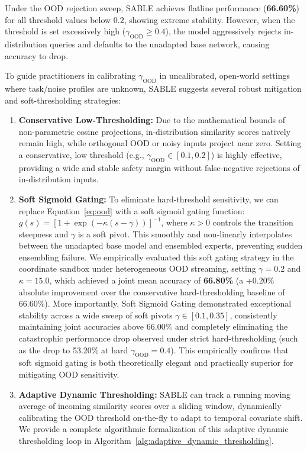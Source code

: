 \begin{itemize}
    Under the OOD rejection sweep, SABLE achieves flatline performance (\textbf{66.60\%}) for all threshold values below $0.2$, showing extreme stability. However, when the threshold is set excessively high ($\gamma_{\text{OOD}} \ge 0.4$), the model aggressively rejects in-distribution queries and defaults to the unadapted base network, causing accuracy to drop. 

    To guide practitioners in calibrating $\gamma_{\text{OOD}}$ in uncalibrated, open-world settings where task/noise profiles are unknown, SABLE suggests several robust mitigation and soft-thresholding strategies:
    \begin{enumerate}
        \item \textbf{Conservative Low-Thresholding:} Due to the mathematical bounds of non-parametric cosine projections, in-distribution similarity scores natively remain high, while orthogonal OOD or noisy inputs project near zero. Setting a conservative, low threshold (e.g., $\gamma_{\text{OOD}} \in [0.1, 0.2]$) is highly effective, providing a wide and stable safety margin without false-negative rejections of in-distribution inputs.
        \item \textbf{Soft Sigmoid Gating:} To eliminate hard-threshold sensitivity, we can replace Equation~\ref{eq:ood} with a soft sigmoid gating function: $g(s) = [1 + \exp(-\kappa (s - \gamma))]^{-1}$, where $\kappa > 0$ controls the transition steepness and $\gamma$ is a soft pivot. This smoothly and non-linearly interpolates between the unadapted base model and ensembled experts, preventing sudden ensembling failure. We empirically evaluated this soft gating strategy in the coordinate sandbox under heterogeneous OOD streaming, setting $\gamma = 0.2$ and $\kappa = 15.0$, which achieved a joint mean accuracy of \textbf{66.80\%} (a +0.20\% absolute improvement over the conservative hard-thresholding baseline of 66.60\%). More importantly, Soft Sigmoid Gating demonstrated exceptional stability across a wide sweep of soft pivots $\gamma \in [0.1, 0.35]$, consistently maintaining joint accuracies above 66.00\% and completely eliminating the catastrophic performance drop observed under strict hard-thresholding (such as the drop to 53.20\% at hard $\gamma_{\text{OOD}} = 0.4$). This empirically confirms that soft sigmoid gating is both theoretically elegant and practically superior for mitigating OOD sensitivity.
        \item \textbf{Adaptive Dynamic Thresholding:} SABLE can track a running moving average of incoming similarity scores over a sliding window, dynamically calibrating the OOD threshold on-the-fly to adapt to temporal covariate shift. We provide a complete algorithmic formalization of this adaptive dynamic thresholding loop in Algorithm~\ref{alg:adaptive_dynamic_thresholding}.
    \end{enumerate}


\end{itemize}
